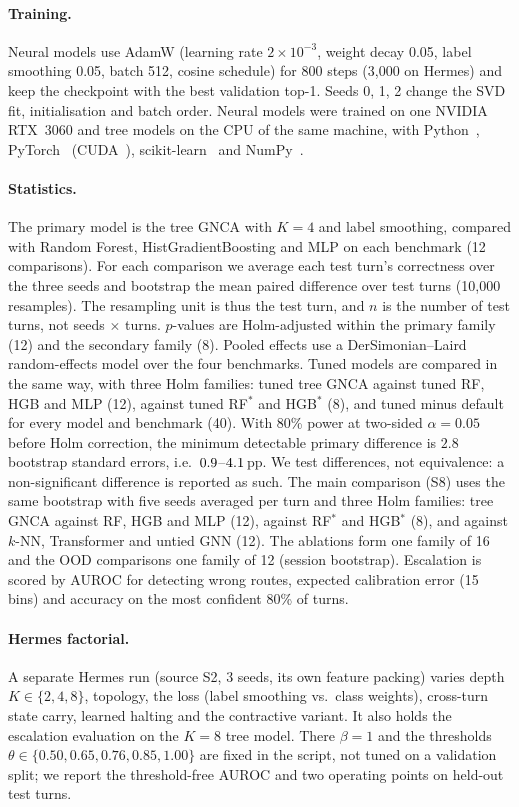 \documentclass[10pt,twocolumn,letterpaper]{article}
\begin{document}
\paragraph{Training.} Neural models use AdamW (learning rate $2\times10^{-3}$, weight decay 0.05, label smoothing 0.05, batch 512, cosine schedule) for 800 steps (3{,}000 on Hermes) and keep the checkpoint with the best validation top-1. Seeds 0, 1, 2 change the SVD fit, initialisation and batch order. Neural models were trained on one NVIDIA RTX~3060 and tree models on the CPU of the same machine, with Python~\numEnvPython, PyTorch~\numEnvTorch{} (CUDA~\numEnvCuda), scikit-learn~\numEnvSklearn{} and NumPy~\numEnvNumpy.
\paragraph{Statistics.} The primary model is the tree GNCA with $K{=}4$ and label smoothing, compared with Random Forest, HistGradientBoosting and MLP on each benchmark (12 comparisons). For each comparison we average each test turn's correctness over the three seeds and bootstrap the mean paired difference over test turns (10{,}000 resamples). The resampling unit is thus the test turn, and $n$ is the number of test turns, not seeds $\times$ turns. $p$-values are Holm-adjusted within the primary family (12) and the secondary family (8). Pooled effects use a DerSimonian--Laird random-effects model over the four benchmarks. Tuned models are compared in the same way, with three Holm families: tuned tree GNCA against tuned RF, HGB and MLP (12), against tuned RF$^\ast$ and HGB$^\ast$ (8), and tuned minus default for every model and benchmark (40). With 80\% power at two-sided $\alpha{=}0.05$ before Holm correction, the minimum detectable primary difference is $2.8$ bootstrap standard errors, i.e.\ $0.9$--$4.1$\,pp. We test differences, not equivalence: a non-significant difference is reported as such. The main comparison (S8) uses the same bootstrap with five seeds averaged per turn and three Holm families: tree GNCA against RF, HGB and MLP (12), against RF$^\ast$ and HGB$^\ast$ (8), and against $k$-NN, Transformer and untied GNN (12). The ablations form one family of 16 and the OOD comparisons one family of 12 (session bootstrap). Escalation is scored by AUROC for detecting wrong routes, expected calibration error (15 bins) and accuracy on the most confident 80\% of turns.
\paragraph{Hermes factorial.} A separate Hermes run (source S2, 3 seeds, its own feature packing) varies depth $K\in\{2,4,8\}$, topology, the loss (label smoothing vs.\ class weights), cross-turn state carry, learned halting and the contractive variant. It also holds the escalation evaluation on the $K{=}8$ tree model. There $\beta{=}1$ and the thresholds $\theta\in\{0.50,0.65,0.76,0.85,1.00\}$ are fixed in the script, not tuned on a validation split; we report the threshold-free AUROC and two operating points on held-out test turns.
\end{document}
